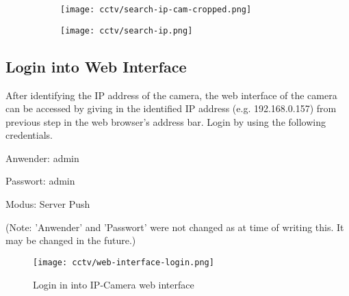 \begin{figure}[ht]
\caption{SearchIPCam.exe}
\label{search-ip-cam-exe}
\centering
	\begin{subfigure}{.49\linewidth}
	\texttt{[image: cctv/search-ip-cam-cropped.png]}
	\end{subfigure}
	\begin{subfigure}{.49\textwidth}
	\texttt{[image: cctv/search-ip.png]}
	\end{subfigure}
\end{figure}

\subsection*{Login into Web Interface}
After identifying the IP address of the camera, the web interface of the camera can be accessed by giving in the identified IP address (e.g. 192.168.0.157) from previous step in the web browser's address bar. Login by using the following credentials.
\begin{itemize*}
\item Anwender: admin
\item Passwort: admin
\item Modus: Server Push
\end{itemize*}
(Note: 'Anwender' and 'Passwort' were not changed as at time of writing this. It may be changed in the future.)

\begin{figure}[ht]
\caption{Login in into IP-Camera web interface}
\label{ip-camera-web-interface}
\centering
\texttt{[image: cctv/web-interface-login.png]}
\end{figure}

